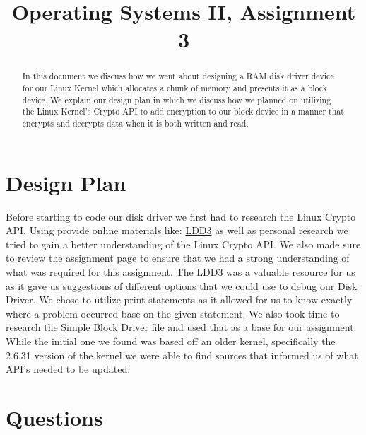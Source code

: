 \documentclass[letterpaper,onecolumn,11pt,titlepage]{IEEEtran}
\begin{document}
\begin{titlepage}
\title{Operating Systems II, Assignment 3}
\author
{
}
        \maketitle
        \vspace{4cm}
        \begin{abstract}
        \noindent In this document we discuss how we went about designing a RAM disk driver device for our Linux Kernel which allocates a chunk of memory and presents it as a block device. We explain our design plan in which we discuss how we planned on utilizing the Linux Kernel's Crypto API to add encryption to our block device in a manner that encrypts and decrypts data when it is both written and read.

        \end{abstract}

\end{titlepage}

\newpage

\section{Design Plan}
\par Before starting to code our disk driver we first had to research the Linux Crypto API. Using provide online materials like: \href{https://lwn.net/Kernel/LDD3/}{LDD3} as well as personal research we tried to gain a better understanding of the Linux Crypto API. We also made sure to review the assignment page to ensure that we had a strong understanding of what was required for this assignment. The LDD3 was a valuable resource for us as it gave us suggestions of different options that we could use to debug our Disk Driver. We chose to utilize print statements as it allowed for us to know exactly where a problem occurred base on the given statement. We also took time to research the Simple Block Driver file and used that as a base for our assignment. While the initial one we found was based off an older kernel, specifically the 2.6.31 version of the kernel we were able to find sources that informed us of what API's needed to be updated.

\section{Questions}
\end{document}
